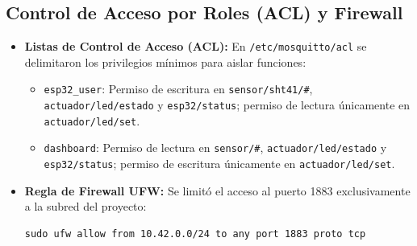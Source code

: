 \subsection{Control de Acceso por Roles (ACL) y Firewall}
\begin{itemize}
    \item \proyectoBadge \textbf{Listas de Control de Acceso (ACL):} En \texttt{/etc/mosquitto/acl} se delimitaron los privilegios mínimos para aislar funciones:
    \begin{itemize}[noitemsep]
        \item \texttt{esp32\_user}: Permiso de escritura en \texttt{sensor/sht41/\#}, \texttt{actuador/led/estado} y \texttt{esp32/status}; permiso de lectura únicamente en \texttt{actuador/led/set}.
        \item \texttt{dashboard}: Permiso de lectura en \texttt{sensor/\#}, \texttt{actuador/led/estado} y \texttt{esp32/status}; permiso de escritura únicamente en \texttt{actuador/led/set}.
    \end{itemize}
    \item \proyectoBadge \textbf{Regla de Firewall UFW:} Se limitó el acceso al puerto 1883 exclusivamente a la subred del proyecto:
    \begin{lstlisting}[style=custombash]
sudo ufw allow from 10.42.0.0/24 to any port 1883 proto tcp
    \end{lstlisting}
\end{itemize}
